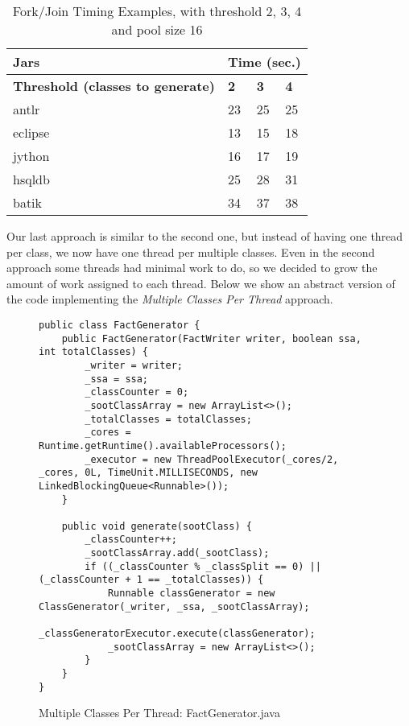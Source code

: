 \documentclass{dithesis}
\begin{document}
		\begin{table}[H]
			\centering
            \begin{tabular}{@{}l|lll@{}}
            \toprule
            \textbf{Jars}    	& \multicolumn{3}{l}{\textbf{Time (sec.)}}  \\ \midrule
            \textbf{Threshold (classes to generate)} 	& \textbf{2}  & \textbf{3}  & \textbf{4}  \\ \midrule
            antlr            	& 23          & 25           & 25           \\
            eclipse          	& 13          & 15           & 18           \\
            jython           	& 16          & 17           & 19           \\
            hsqldb           	& 25          & 28           & 31           \\
            batik            	& 34          & 37           & 38           \\ \bottomrule
            \end{tabular}
            \newline
			\caption[Fork/Join Timing Examples]{Fork/Join Timing Examples, with threshold 2, 3, 4 and pool size 16}
		\end{table}



        Our last approach is similar to the second one, but instead of having one thread per class, we now have one thread per multiple classes. Even in the second approach some threads had minimal work to do, so we decided to grow the amount of work assigned to each thread. Below we show an abstract version of the code implementing the \textit{Multiple Classes Per Thread} approach.

        \begin{figure}[H]
\begin{lstlisting}
public class FactGenerator {
    public FactGenerator(FactWriter writer, boolean ssa, int totalClasses) {
        _writer = writer;
        _ssa = ssa;
        _classCounter = 0;
        _sootClassArray = new ArrayList<>();
        _totalClasses = totalClasses;
        _cores = Runtime.getRuntime().availableProcessors();
        _executor = new ThreadPoolExecutor(_cores/2, _cores, 0L, TimeUnit.MILLISECONDS, new LinkedBlockingQueue<Runnable>());
    }

    public void generate(sootClass) {
        _classCounter++;
        _sootClassArray.add(_sootClass);
        if ((_classCounter % _classSplit == 0) || (_classCounter + 1 == _totalClasses)) {
            Runnable classGenerator = new ClassGenerator(_writer, _ssa, _sootClassArray);
            _classGeneratorExecutor.execute(classGenerator);
            _sootClassArray = new ArrayList<>();
        }
    }
}
\end{lstlisting}
        \caption{Multiple Classes Per Thread: FactGenerator.java}
        \end{figure}
\end{document}
